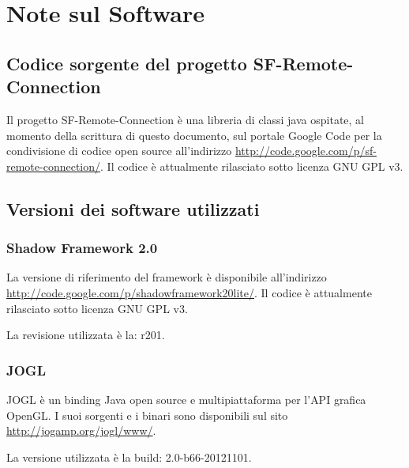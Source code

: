 
\chapter{Note sul Software}
\label{a:notesoftware}

\section{Codice sorgente del progetto SF-Remote-Connection}
\label{sec:sfrcsource}
Il progetto SF-Remote-Connection \`e una libreria di classi java ospitate, al momento della scrittura di questo documento, sul portale Google Code per la condivisione di codice open source all'indirizzo \url{http://code.google.com/p/sf-remote-connection/}.
Il codice \`e attualmente rilasciato sotto licenza GNU GPL v3.



\section{Versioni dei software utilizzati}
\label{sec:versionisw}

\subsection{Shadow Framework 2.0}
\label{sub:sfsource}
La versione di riferimento del framework \`e disponibile all'indirizzo \url{http://code.google.com/p/shadowframework20lite/}. Il codice \`e attualmente rilasciato sotto licenza GNU GPL v3.

La revisione utilizzata \`e la: r201.

\subsection{JOGL}
\label{sub:jogl}
JOGL \`e un binding Java open source e multipiattaforma per l'\ac{API} grafica OpenGL.
I suoi sorgenti e i binari sono disponibili sul sito \url{http://jogamp.org/jogl/www/}.

La versione utilizzata \`e la build: 2.0-b66-20121101.
